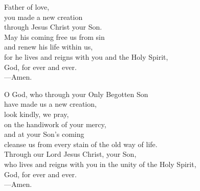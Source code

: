 \prayer


\begin{prayerverse}
Father of love,\\
you made a new creation\\
through Jesus Christ your Son.\\
May his coming free us from sin\\
and renew his life within us,\\
for he lives and reigns with you and the Holy Spirit,\\
God, for ever and ever.\\
{\color{red}---\thinspace}Amen.
\end{prayerverse}


\begin{prayerverse}
O God, who through your Only Begotten Son\\
have made us a new creation,\\
look kindly, we pray,\\
on the handiwork of your mercy,\\
and at your Son’s coming\\
cleanse us from every stain of the old way of life.\\
Through our Lord Jesus Christ, your Son,\\
who lives and reigns with you in the unity of the Holy Spirit,\\
God, for ever and ever.\\
{\color{red}---\thinspace}Amen.
\end{prayerverse}

